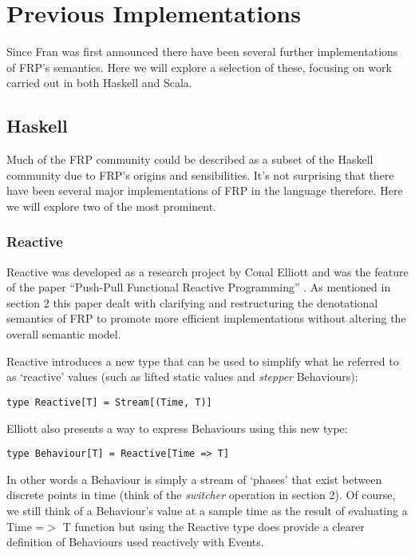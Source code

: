 \chapter{Previous Implementations}
  Since Fran was first announced there have been several further implementations of FRP's semantics. Here
  we will explore a selection of these, focusing on work carried out in both Haskell and Scala.
  
  \section{Haskell}
    Much of the FRP community could be described as a subset of the Haskell community due to FRP's
    origins and sensibilities. It's not surprising that there have been several major implementations
    of FRP in the language therefore. Here we will explore two of the most prominent.
    
    \subsection{Reactive}
      Reactive was developed as a research project by Conal Elliott and was the feature
      of the paper ``Push-Pull Functional Reactive Programming'' \cite{Elliott2009}. As mentioned
      in section 2 this paper dealt with clarifying and restructuring the denotational
      semantics of FRP
      to promote more efficient implementations without altering the overall semantic model.
      
      Reactive introduces a new type that can be used to simplify what he referred to as
      `reactive' values (such as lifted static values and \emph{stepper} Behaviours):
    
\begin{verbatim}
type Reactive[T] = Stream[(Time, T)]
\end{verbatim}

      Elliott also presents a way to express Behaviours using this new type:
      
\begin{verbatim}
type Behaviour[T] = Reactive[Time => T]
\end{verbatim}      

      In other words a Behaviour is simply a stream of `phases' that exist between discrete
      points in time (think of the \emph{switcher} operation in section 2). Of course, we
      still think of a Behaviour's value at a sample time as the result of evaluating a
      Time =$>$ T function but using the Reactive type
      does provide a clearer definition of Behaviours used reactively with Events.
      
